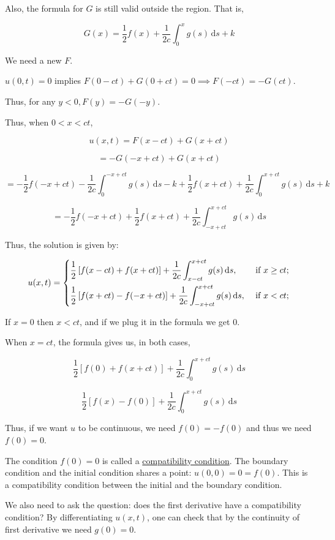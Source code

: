 \documentclass{article}
\theoremstyle{definition}
\begin{document}
Also, the formula for \(G\) is still valid outside the region. That is,

\[
    G(x)=\frac{1}{2}f(x) + \frac{1}{2c}\int_{0}^{x} g(s) \,\mathrm{d}s + k
\]

We need a new \(F\).

\(u(0,t)=0\) implies \(F(0-ct)+G(0+ct)=0 \implies F(-ct)=-G(ct)\).

Thus, for any \(y < 0, F(y)=-G(-y)\).

Thus, when \(0 < x < ct\),

\[
    u(x,t) = F(x-ct) + G(x + ct)
\]

\[
    = -G(-x + ct) + G(x + ct)
\]

\[
    = -\frac{1}{2}f(-x + ct) - \frac{1}{2c}\int_{0}^{-x + ct} g(s) \,\mathrm{d}s - k + \frac{1}{2}f(x + ct) + \frac{1}{2c}\int_{0}^{x + ct} g(s) \,\mathrm{d}s + k
\]

\[
    = -\frac{1}{2} f(-x+ct)+\frac{1}{2}f(x+ct) +\frac{1}{2c} \int_{-x + ct}^{x + ct} g(s) \,\mathrm{d}s 
\]

Thus, the solution is given by:

\[
    u(x,t) = \begin{dcases}
        \frac{1}{2}\left[ f(x - ct) + f(x + ct) \right] + \frac{1}{2c} \int_{x - ct}^{x + ct} g(s) \,\mathrm{d}s , &\text{ if } x \geq ct ;\\
        \frac{1}{2}\left[ f(x + ct) - f(-x + ct) \right] + \frac{1}{2c} \int_{-x + ct}^{x + ct} g(s) \,\mathrm{d}s , &\text{ if } x < ct ;
    \end{dcases}
\]

If \(x = 0\) then \(x < ct\), and if we plug it in the formula we get \(0\).

When \(x = ct\), the formula gives us, in both cases,

\[
    \frac{1}{2}[f(0)+f(x+ct)] + \frac{1}{2c} \int_{0}^{x + ct} g(s) \,\mathrm{d}s 
\]

\[
    \frac{1}{2}[f(x)-f(0)] + \frac{1}{2c}\int_{0}^{x + ct} g(s) \,\mathrm{d}s 
\]

Thus, if we want \(u\) to be continuous, we need \(f(0)=-f(0)\) and thus we need \(f(0) = 0\).

The condition \(f(0)=0\) is called a \underline{compatibility condition}. The boundary condition and the initial condition shares a point: \(u(0,0)=0=f(0)\). This is a compatibility condition between the initial and the boundary condition.

We also need to ask the question: does the first derivative have a compatibility condition? By differentiating \(u(x,t)\), one can check that by the continuity of first derivative we need \(g(0)=0\).
\end{document}
